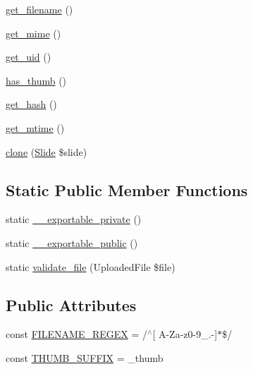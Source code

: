 \begin{DoxyCompactItemize}
\item 
\hyperlink{classlibresignage_1_1common_1_1php_1_1slide_1_1SlideAsset_a75ea748677248f7a63864e963f75272e}{get\+\_\+filename} ()
\item 
\hyperlink{classlibresignage_1_1common_1_1php_1_1slide_1_1SlideAsset_a942c6f88a026753a3047347328eb9e72}{get\+\_\+mime} ()
\item 
\hyperlink{classlibresignage_1_1common_1_1php_1_1slide_1_1SlideAsset_a1adc3e5500dd869fd44fbb8f8fad9ce2}{get\+\_\+uid} ()
\item 
\hyperlink{classlibresignage_1_1common_1_1php_1_1slide_1_1SlideAsset_ad554a899b8df4445c028b723d74c0daa}{has\+\_\+thumb} ()
\item 
\hyperlink{classlibresignage_1_1common_1_1php_1_1slide_1_1SlideAsset_a61afe97afca25bddb41ebd91e8ff9422}{get\+\_\+hash} ()
\item 
\hyperlink{classlibresignage_1_1common_1_1php_1_1slide_1_1SlideAsset_a0a7143d0af7634da899b770e16b127bf}{get\+\_\+mtime} ()
\item 
\hyperlink{classlibresignage_1_1common_1_1php_1_1slide_1_1SlideAsset_a021debf9bf225f4bf1fcb3329b4606e6}{clone} (\hyperlink{classlibresignage_1_1common_1_1php_1_1slide_1_1Slide}{Slide} \$slide)
\end{DoxyCompactItemize}
\subsection*{Static Public Member Functions}
\begin{DoxyCompactItemize}
\item 
static \hyperlink{classlibresignage_1_1common_1_1php_1_1slide_1_1SlideAsset_a7e4211ad6caf9d3f977943a31734eed7}{\+\_\+\+\_\+exportable\+\_\+private} ()
\item 
static \hyperlink{classlibresignage_1_1common_1_1php_1_1slide_1_1SlideAsset_a0608e2f276d6bab115a3e9e0c2a434a6}{\+\_\+\+\_\+exportable\+\_\+public} ()
\item 
static \hyperlink{classlibresignage_1_1common_1_1php_1_1slide_1_1SlideAsset_a0aa445f8fdfc5a37cfdb1dd86bd78b09}{validate\+\_\+file} (Uploaded\+File \$file)
\end{DoxyCompactItemize}
\subsection*{Public Attributes}
\begin{DoxyCompactItemize}
\item 
const \hyperlink{classlibresignage_1_1common_1_1php_1_1slide_1_1SlideAsset_abf9992cbab93d07c7c41c4a947ebbbcc}{F\+I\+L\+E\+N\+A\+M\+E\+\_\+\+R\+E\+G\+EX} = \textquotesingle{}/$^\wedge$\mbox{[} A-\/Za-\/z0-\/9\+\_\+.-\/\mbox{]}$\ast$\$/\textquotesingle{}
\item 
const \hyperlink{classlibresignage_1_1common_1_1php_1_1slide_1_1SlideAsset_a05800f5eb93ad654211eea6e34db568e}{T\+H\+U\+M\+B\+\_\+\+S\+U\+F\+F\+IX} = \textquotesingle{}\+\_\+thumb\textquotesingle{}
\end{DoxyCompactItemize}
